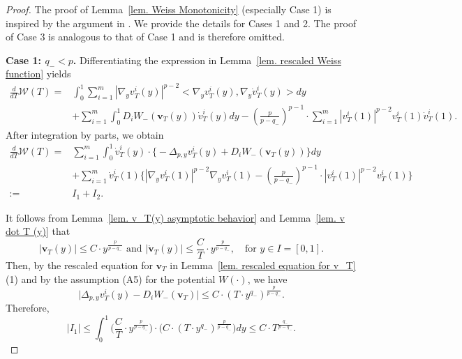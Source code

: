 \documentclass[11pt,twoside,reqno]{amsart}
\newcounter{assu}
\numberwithin{equation}{section}
\begin{document}
\begin{proof}
The proof of Lemma~\ref{lem. Weiss Monotonicity} (especially Case 1) is inspired by the argument in  \cite{W99}.
We provide the details for
Cases 1 and 2. The proof of Case 3 is analogous to that of Case 1 and is
therefore omitted.



{\bf{Case 1:  $q_{-}<p$.}} Differentiating the expression in Lemma~\ref{lem. rescaled Weiss function} yields
\begin{align*}
    \frac{d}{dT}\mathcal{W}(T) =&\int_0^1 \sum_{i=1}^m |\nabla_y v_T^i(y)|^{p-2}<\nabla_y v_T^i(y), \nabla_y \dot{v}_T^i(y)> dy\\
    &+ \sum_{i=1}^m \int_0^1 D_i W_{-}(\mathbf{v}_T(y)) \dot{v}_T^i(y) dy-(\frac{p}{p-q_{-}})^{p-1}\cdot\sum_{i=1}^m | v_T^i(1)|^{p-2} v_T^i(1) \dot{v}_T^i(1).
\end{align*}
After integration by parts, we obtain
\begin{align*}
    \frac{d}{dT}\mathcal{W}(T)=&\sum_{i=1}^{m}\int_{0}^{1}\dot{v}_{T}^{i}(y)\cdot\Big\{-\Delta_{p,y}v_{T}^{i}(y)+D_{i}W_{-}(\mathbf{v}_T(y))\Big\}dy\\
    &+\sum_{i=1}^{m}\dot{v}_{T}^{i}(1)\Big\{|\nabla_{y}v_{T}^{i}(1)|^{p-2}\nabla_{y}v_{T}^{i}(1)-(\frac{p}{p-q_{-}})^{p-1}\cdot|v_{T}^{i}(1)|^{p-2}v_{T}^{i}(1)\Big\}\\
    :=&I_1+I_2.
\end{align*}

It follows from Lemma~\ref{lem. v_T(y) asymptotic behavior} and Lemma~\ref{lem. v dot T (y)} that
\begin{equation*}
    |\mathbf{v}_{T}(y)|\leq C\cdot y^{\frac{p}{p-q_{-}}}\mbox{ and }|\dot{\mathbf{v}}_{T}(y)|\leq \frac{C}{T}\cdot y^{\frac{p}{p-q_{-}}},\quad\mbox{for }y\in I=[0,1].
\end{equation*}
Then, by the rescaled equation for $\mathbf{v}_{T}$ in Lemma~\ref{lem. rescaled equation for v_T} (1) and by the assumption (A5) for the potential $W(\cdot)$, we have
\begin{equation*}
    \Big|\Delta_{p,y}v^{i}_{T}(y)-D_{i}W_{-}(\mathbf{v}_{T})\Big|\leq C\cdot(T\cdot y^{q_{-}})^{\frac{p}{p-q_{-}}}.
\end{equation*}
Therefore,
\begin{equation*}
    |I_{1}|\leq\int_{0}^{1}\Big(\frac{C}{T}\cdot y^{\frac{p}{p-q_{-}}}\Big)\cdot\Big(C\cdot(T\cdot y^{q_{-}})^{\frac{p}{p-q_{-}}}\Big)dy\leq C\cdot T^{\frac{q_{-}}{p-q_{-}}}.
\end{equation*}


\end{proof}
\end{document}
